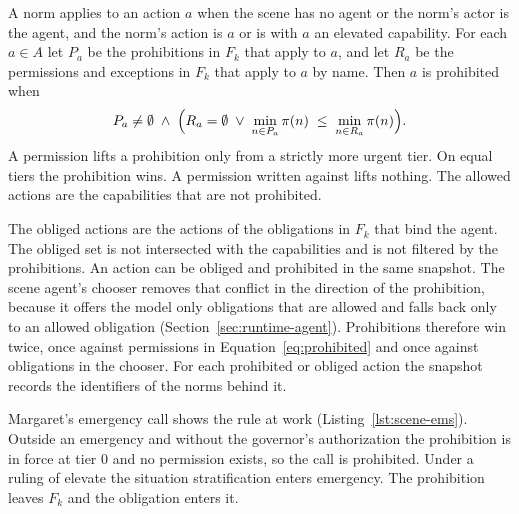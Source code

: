A norm applies to an action $a$ when the scene has no agent or the norm's actor is the agent, and the
norm's action is $a$ or is  with $a$ an elevated capability. For each
$a \in A$ let $P_a$ be the prohibitions in $F_k$ that apply to $a$, and let $R_a$ be the permissions
and exceptions in $F_k$ that apply to $a$ by name. Then $a$ is prohibited when
\begin{equation}
P_a \neq \emptyset \;\wedge\; \Bigl( R_a = \emptyset \;\vee\;
\min_{n \in P_a} \pi(n) \;\le\; \min_{n \in R_a} \pi(n) \Bigr).
\label{eq:prohibited}
\end{equation}
A permission lifts a prohibition only from a strictly more urgent tier. On equal tiers the
prohibition wins. A permission written against  lifts nothing. The allowed
actions are the capabilities that are not prohibited.

The obliged actions are the actions of the obligations in $F_k$ that bind the agent. The obliged set
is not intersected with the capabilities and is not filtered by the prohibitions. An action can be
obliged and prohibited in the same snapshot. The scene agent's chooser removes that conflict in the
direction of the prohibition, because it offers the model only obligations that are allowed and
falls back only to an allowed obligation (Section~\ref{sec:runtime-agent}). Prohibitions therefore
win twice, once against permissions in Equation~\eqref{eq:prohibited} and once against obligations
in the chooser. For each prohibited or obliged action the snapshot records the identifiers of the
norms behind it.

Margaret's emergency call shows the rule at work (Listing~\ref{lst:scene-ems}). Outside an
emergency and without the governor's authorization the prohibition  is in force at tier 0
and no permission exists, so the call is prohibited. Under a ruling of elevate the situation
stratification enters emergency. The prohibition leaves $F_k$ and the obligation  enters it.

